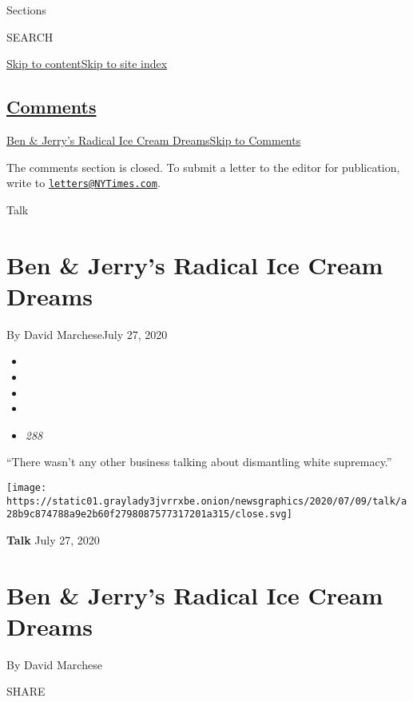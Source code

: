 Sections

SEARCH

\protect\hyperlink{site-content}{Skip to
content}\protect\hyperlink{site-index}{Skip to site index}

\hypertarget{comments}{%
\subsection{\texorpdfstring{\protect\hyperlink{commentsContainer}{Comments}}{Comments}}\label{comments}}

\href{}{Ben \& Jerry's Radical Ice Cream Dreams}\href{}{Skip to
Comments}

The comments section is closed. To submit a letter to the editor for
publication, write to
\href{mailto:letters@NYTimes.com}{\nolinkurl{letters@NYTimes.com}}.

Talk

\hypertarget{ben--jerrys-radical-ice-cream-dreams}{%
\section{Ben \& Jerry's Radical Ice Cream
Dreams}\label{ben--jerrys-radical-ice-cream-dreams}}

By David MarcheseJuly 27, 2020

\begin{itemize}
\item
\item
\item
\item
\item
  \emph{288}
\end{itemize}

``There wasn't any other business talking about dismantling white
supremacy.''

\texttt{[image: https://static01.graylady3jvrrxbe.onion/newsgraphics/2020/07/09/talk/a28b9c874788a9e2b60f2798087577317201a315/close.svg]}

\textbf{Talk} July 27, 2020

\hypertarget{ben--jerrys-radical-ice-cream-dreams-1}{%
\section{Ben \& Jerry's Radical Ice Cream
Dreams}\label{ben--jerrys-radical-ice-cream-dreams-1}}

By David Marchese

SHARE

